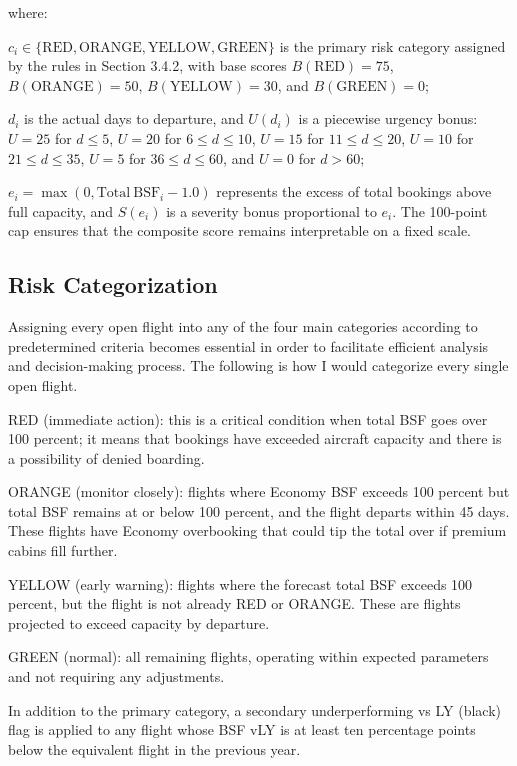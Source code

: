 where:

$c_i \in \{\text{RED}, \text{ORANGE}, \text{YELLOW}, \text{GREEN}\}$ is the primary risk category assigned by the rules in Section 3.4.2, with base scores $B(\text{RED}) = 75$, $B(\text{ORANGE}) = 50$, $B(\text{YELLOW}) = 30$, and $B(\text{GREEN}) = 0$;

$d_i$ is the actual days to departure, and $U(d_i)$ is a piecewise urgency bonus: $U = 25$ for $d \leq 5$, $U = 20$ for $6 \leq d \leq 10$, $U = 15$ for $11 \leq d \leq 20$, $U = 10$ for $21 \leq d \leq 35$, $U = 5$ for $36 \leq d \leq 60$, and $U = 0$ for $d > 60$;

$e_i = \max(0, \mathrm{Total\ BSF}_i - 1.0)$ represents the excess of total bookings above full capacity, and $S(e_i)$ is a severity bonus proportional to $e_i$. The 100-point cap ensures that the composite score remains interpretable on a fixed scale.

\subsection{Risk Categorization}

Assigning every open flight into any of the four main categories according to predetermined criteria becomes essential in order to facilitate efficient analysis and decision-making process. The following is how I would categorize every single open flight.

RED (immediate action): this is a critical condition when total BSF goes over 100 percent; it means that bookings have exceeded aircraft capacity and there is a possibility of denied boarding.

ORANGE (monitor closely): flights where Economy BSF exceeds 100 percent but total BSF remains at or below 100 percent, and the flight departs within 45 days. These flights have Economy overbooking that could tip the total over if premium cabins fill further.

YELLOW (early warning): flights where the forecast total BSF exceeds 100 percent, but the flight is not already RED or ORANGE. These are flights projected to exceed capacity by departure.

GREEN (normal): all remaining flights, operating within expected parameters and not requiring any adjustments.

In addition to the primary category, a secondary underperforming vs LY (black) flag is applied to any flight whose BSF vLY is at least ten percentage points below the equivalent flight in the previous year.

